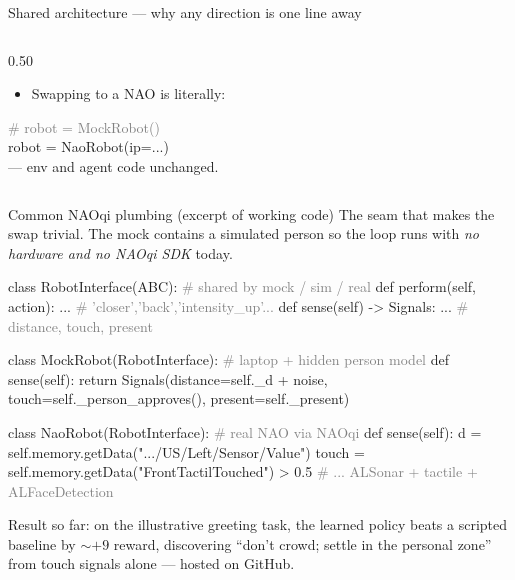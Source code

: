 \documentclass[aspectratio=169,10pt]{beamer}
\begin{document}
\begin{frame}{Shared architecture --- why any direction is one line away}
\begin{columns}[c,onlytextwidth]
\begin{column}{0.50\textwidth}
\begin{itemize}
        \item Swapping to a NAO is literally:
      \end{itemize}
      \vspace{0.2em}
      {\scriptsize\ttfamily
      \textcolor{gray}{\# robot = MockRobot()}\\
      robot = NaoRobot(ip=...)\\
      }
      {\footnotesize \quad --- env and agent code unchanged.}
    \end{column}
  \end{columns}
\end{frame}

\begin{frame}[fragile]{Common NAOqi plumbing (excerpt of working code)}
  \scriptsize
  The seam that makes the swap trivial. The mock contains a simulated person so the loop runs with \emph{no hardware and no NAOqi SDK} today.
\begin{semiverbatim}\scriptsize
class RobotInterface(ABC):           \textcolor{gray}{# shared by mock / sim / real}
    def perform(self, action): ...   \textcolor{gray}{# 'closer','back','intensity_up'...}
    def sense(self) -> Signals: ...  \textcolor{gray}{# {distance, touch, present}}

class MockRobot(RobotInterface):     \textcolor{gray}{# laptop + hidden person model}
    def sense(self):
        return Signals(distance=self._d + noise,
                       touch=self._person_approves(),
                       present=self._present)

class NaoRobot(RobotInterface):      \textcolor{gray}{# real NAO via NAOqi}
    def sense(self):
        d = self.memory.getData(".../US/Left/Sensor/Value")
        touch = self.memory.getData("FrontTactilTouched") > 0.5
        \textcolor{gray}{# ... ALSonar + tactile + ALFaceDetection}
\end{semiverbatim}
  \vspace{-0.2em}
  \alert{Result so far:} on the illustrative greeting task, the learned policy beats a scripted baseline by $\sim +9$ reward, discovering ``don't crowd; settle in the personal zone'' from touch signals alone --- hosted on GitHub.
\end{frame}
\end{document}
